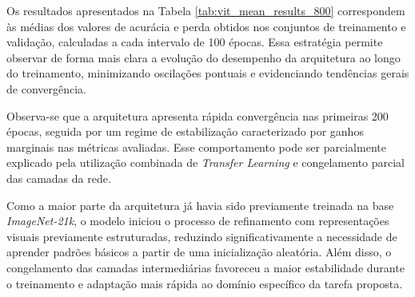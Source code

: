 Os resultados apresentados na Tabela \ref{tab:vit_mean_results_800} correspondem às médias dos valores de acurácia e perda obtidos nos conjuntos de treinamento e validação, calculadas a cada intervalo de 100 épocas. Essa estratégia permite observar de forma mais clara a evolução do desempenho da arquitetura ao longo do treinamento, minimizando oscilações pontuais e evidenciando tendências gerais de convergência.

Observa-se que a arquitetura apresenta rápida convergência nas primeiras 200 épocas, seguida por um regime de estabilização caracterizado por ganhos marginais nas métricas avaliadas. Esse comportamento pode ser parcialmente explicado pela utilização combinada de \textit{Transfer Learning} e congelamento parcial das camadas da rede.

Como a maior parte da arquitetura já havia sido previamente treinada na base \textit{ImageNet-21k}, o modelo iniciou o processo de refinamento com representações visuais previamente estruturadas, reduzindo significativamente a necessidade de aprender padrões básicos a partir de uma inicialização aleatória. Além disso, o congelamento das camadas intermediárias favoreceu a maior estabilidade durante o treinamento e adaptação mais rápida ao domínio específico da tarefa proposta.

